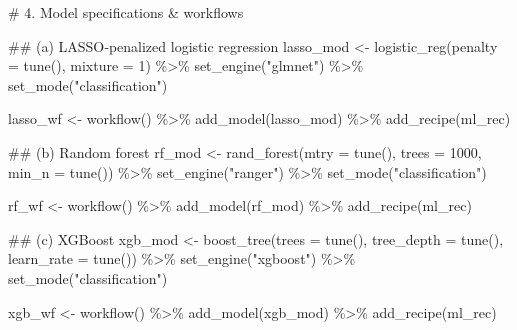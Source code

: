 \documentclass[
  letterpaper,
  DIV=11,
  numbers=noendperiod]{scrartcl}
\newenvironment{Shaded}{}{}
\newcommand{\AttributeTok}[1]{\textcolor[rgb]{0.84,0.23,0.29}{#1}}
\newcommand{\CommentTok}[1]{\textcolor[rgb]{0.42,0.45,0.49}{#1}}
\newcommand{\DecValTok}[1]{\textcolor[rgb]{0.00,0.36,0.77}{#1}}
\newcommand{\DocumentationTok}[1]{\textcolor[rgb]{0.42,0.45,0.49}{#1}}
\newcommand{\FunctionTok}[1]{\textcolor[rgb]{0.44,0.26,0.76}{#1}}
\newcommand{\NormalTok}[1]{\textcolor[rgb]{0.14,0.16,0.18}{#1}}
\newcommand{\OtherTok}[1]{\textcolor[rgb]{0.44,0.26,0.76}{#1}}
\newcommand{\SpecialCharTok}[1]{\textcolor[rgb]{0.00,0.36,0.77}{#1}}
\newcommand{\StringTok}[1]{\textcolor[rgb]{0.01,0.18,0.38}{#1}}
\begin{document}
\begin{Shaded}
\begin{Highlighting}[]
\CommentTok{\# 4. Model specifications \& workflows}

\DocumentationTok{\#\# (a) LASSO‐penalized logistic regression}
\NormalTok{lasso\_mod }\OtherTok{\textless{}{-}} \FunctionTok{logistic\_reg}\NormalTok{(}\AttributeTok{penalty =} \FunctionTok{tune}\NormalTok{(), }\AttributeTok{mixture =} \DecValTok{1}\NormalTok{) }\SpecialCharTok{\%\textgreater{}\%}
  \FunctionTok{set\_engine}\NormalTok{(}\StringTok{"glmnet"}\NormalTok{) }\SpecialCharTok{\%\textgreater{}\%}
  \FunctionTok{set\_mode}\NormalTok{(}\StringTok{"classification"}\NormalTok{)}

\NormalTok{lasso\_wf  }\OtherTok{\textless{}{-}} \FunctionTok{workflow}\NormalTok{() }\SpecialCharTok{\%\textgreater{}\%} 
  \FunctionTok{add\_model}\NormalTok{(lasso\_mod) }\SpecialCharTok{\%\textgreater{}\%} 
  \FunctionTok{add\_recipe}\NormalTok{(ml\_rec)}

\DocumentationTok{\#\# (b) Random forest}
\NormalTok{rf\_mod }\OtherTok{\textless{}{-}} \FunctionTok{rand\_forest}\NormalTok{(}\AttributeTok{mtry =} \FunctionTok{tune}\NormalTok{(), }\AttributeTok{trees =} \DecValTok{1000}\NormalTok{, }\AttributeTok{min\_n =} \FunctionTok{tune}\NormalTok{()) }\SpecialCharTok{\%\textgreater{}\%}
  \FunctionTok{set\_engine}\NormalTok{(}\StringTok{"ranger"}\NormalTok{) }\SpecialCharTok{\%\textgreater{}\%}
  \FunctionTok{set\_mode}\NormalTok{(}\StringTok{"classification"}\NormalTok{)}

\NormalTok{rf\_wf  }\OtherTok{\textless{}{-}} \FunctionTok{workflow}\NormalTok{() }\SpecialCharTok{\%\textgreater{}\%} 
  \FunctionTok{add\_model}\NormalTok{(rf\_mod) }\SpecialCharTok{\%\textgreater{}\%} 
  \FunctionTok{add\_recipe}\NormalTok{(ml\_rec)}

\DocumentationTok{\#\# (c) XGBoost}
\NormalTok{xgb\_mod }\OtherTok{\textless{}{-}} \FunctionTok{boost\_tree}\NormalTok{(}\AttributeTok{trees =} \FunctionTok{tune}\NormalTok{(),}
                      \AttributeTok{tree\_depth =} \FunctionTok{tune}\NormalTok{(),}
                      \AttributeTok{learn\_rate =} \FunctionTok{tune}\NormalTok{()) }\SpecialCharTok{\%\textgreater{}\%}
  \FunctionTok{set\_engine}\NormalTok{(}\StringTok{"xgboost"}\NormalTok{) }\SpecialCharTok{\%\textgreater{}\%}
  \FunctionTok{set\_mode}\NormalTok{(}\StringTok{"classification"}\NormalTok{)}

\NormalTok{xgb\_wf }\OtherTok{\textless{}{-}} \FunctionTok{workflow}\NormalTok{() }\SpecialCharTok{\%\textgreater{}\%} 
  \FunctionTok{add\_model}\NormalTok{(xgb\_mod) }\SpecialCharTok{\%\textgreater{}\%} 
  \FunctionTok{add\_recipe}\NormalTok{(ml\_rec)}


\end{Highlighting}
\end{Shaded}
\end{document}

